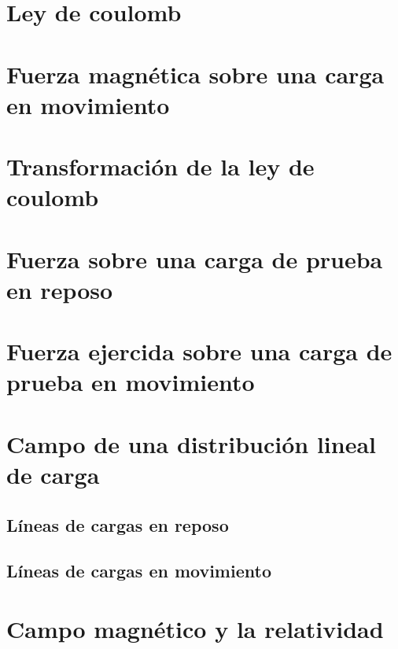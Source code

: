 \documentclass[../main]{subfiles}
\begin{document}
\chapter{Ley de coulomb}

\chapter{Fuerza magnética sobre una carga en movimiento}

\chapter{Transformación de la ley de coulomb}

\chapter{Fuerza sobre una carga de prueba en reposo}

\chapter{Fuerza ejercida sobre una carga de prueba en movimiento}

\chapter{Campo de una distribución lineal de carga}

\section{Líneas de cargas en reposo}

\section{Líneas de cargas en movimiento}

\chapter{Campo magnético y la relatividad}
\end{document}
